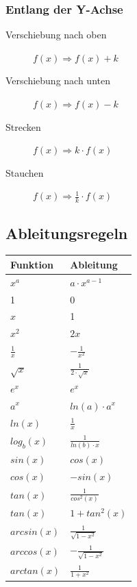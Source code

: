 \subsubsection{Entlang der Y-Achse}
\begin{description}
	\item[Verschiebung nach oben] $f(x) \Rightarrow f(x) + k$
	\item[Verschiebung nach unten] $f(x) \Rightarrow f(x) - k$
	\item[Strecken] $f(x) \Rightarrow k \cdot f(x)$
	\item[Stauchen] $f(x) \Rightarrow \frac{1}{k} \cdot f(x)$
\end{description}

\subsection{Ableitungsregeln}
\begin{tabu} to \linewidth {|X|X|}
	\hline
	Funktion 	& Ableitung \\ 
	\hline\hline
	$x^a$ & $a \cdot x^{a-1}$ \\  & 0 \\ \hline
	$x$ & 1 \\ \hline
	$x^2$ & $2x$ \\ \hline
	$\frac{1}{x}$ & $-\frac{1}{x^2}$ \\ \hline
	$\sqrt{x}$ & $\frac{1}{2 \cdot \sqrt{x}}$ \\ \hline
	$e^x$ & $e^x$ \\ \hline
	$a^x$ & $ln(a) \cdot a^x$  \\ \hline
	$ln(x)$ & $\frac{1}{x}$ \\ \hline
	$log_b(x)$ & $\frac{1}{ln(b) \cdot x}$ \\ \hline
	$sin(x)$ & $cos(x)$ \\ \hline
	$cos(x)$ & $-sin(x)$ \\ \hline
	$tan(x)$ & $\frac{1}{cos^2(x)}$ \\ \hline
	$tan(x)$ & $1 + tan^2(x)$ \\ \hline
	$arcsin(x)$ & $\frac{1}{\sqrt{1-x^2}}$ \\ \hline
	$arccos(x)$ & $-\frac{1}{\sqrt{1-x^2}}$ \\ \hline
	$arctan(x)$ & $\frac{1}{1+x^2}$ \\ \hline
\end{tabu}

